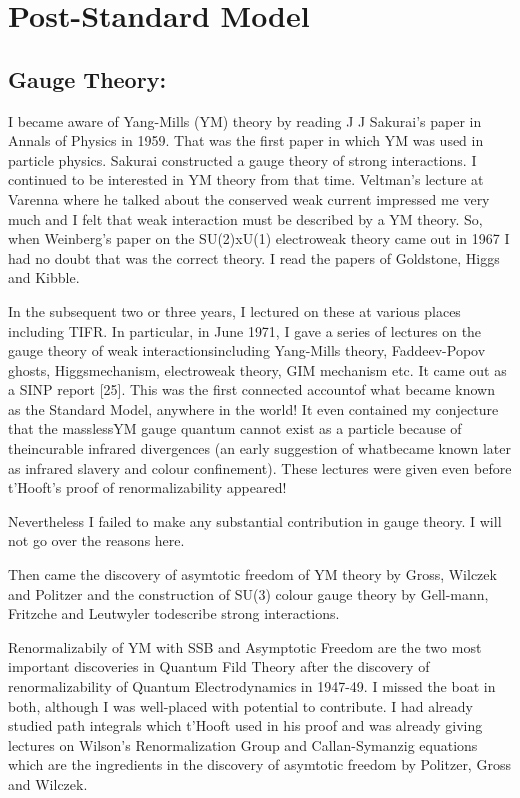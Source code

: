 \vspace{-\topsep}
\section*{Post-Standard Model}

\subsection*{Gauge Theory:}

I became aware of Yang-Mills (YM) theory by reading J J Sakurai's paper 
in Annals of Physics in 1959. That was the first paper in which YM was 
used in particle physics. Sakurai constructed a gauge theory of strong 
interactions. I continued to be intere\-sted in YM theory from that time. 
Veltman's lecture at Varenna where he talked about the conserved weak 
current impressed me very much and I felt that weak interaction must be 
described by a YM theory. So, when Weinberg's paper on the SU(2)xU(1)\break 
electroweak theory came out in 1967 I had no doubt that was the correct 
theory. I read the papers of Goldstone, Higgs and Kibble.

In the subsequent two or three years, I lectured on these at various 
places including TIFR. In particular, in June 1971, I gave a series of 
lectures on the gauge theory of weak interactions\break including Yang-Mills 
theory, Faddeev-Popov ghosts, Higgs\break mechanism, electroweak theory, GIM 
mechanism etc. It came out as a SINP report [25]. This was the first 
connected account\break of what became known as the Standard Model, anywhere 
in the world! It even contained my conjecture that the massless\break YM gauge 
quantum cannot exist as a particle because of the\break incurable infrared 
divergences (an early suggestion of what\break became known later as infrared 
slavery and colour confinement). These lectures were given even before 
t'Hooft's proof of renorma\-lizability appeared!

Nevertheless I failed to make any substantial contribution in gauge 
theory. I will not go over the reasons here.

Then came the discovery of asymtotic freedom of YM theory by Gross, 
Wilczek and Politzer and the construction of SU(3) colour gauge theory 
by Gell-mann, Fritzche and Leutwyler to\break describe strong interactions.

Renormalizabily of YM with SSB and Asymptotic Freedom are the two most 
important discoveries in Quantum Fild Theory after the discovery of 
renormalizability of Quantum Electrodynamics in 1947-49. I missed the 
boat in both, although I was well-placed with potential to contribute. I 
had already studied path integrals which t'Hooft used in his proof and 
was already giving lectures on Wilson's Renormalization Group and 
Callan-Symanzig equations which are the ingredients in the discovery of 
asymtotic freedom by Politzer, Gross and Wilczek.

